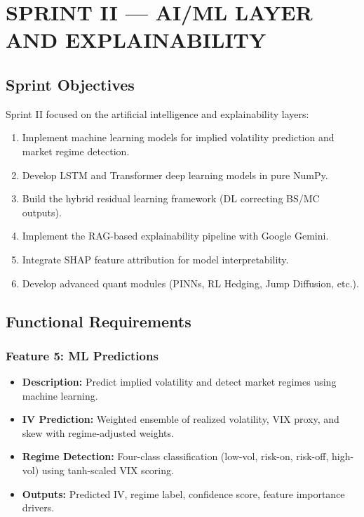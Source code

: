 \documentclass[12pt,a4paper]{report}
\begin{document}

\chapter{SPRINT II --- AI/ML LAYER AND EXPLAINABILITY}

\section{Sprint Objectives}

Sprint II focused on the artificial intelligence and explainability layers:

\begin{enumerate}
    \item Implement machine learning models for implied volatility prediction and market regime detection.
    \item Develop LSTM and Transformer deep learning models in pure NumPy.
    \item Build the hybrid residual learning framework (DL correcting BS/MC outputs).
    \item Implement the RAG-based explainability pipeline with Google Gemini.
    \item Integrate SHAP feature attribution for model interpretability.
    \item Develop advanced quant modules (PINNs, RL Hedging, Jump Diffusion, etc.).
\end{enumerate}

\section{Functional Requirements}

\subsection{Feature 5: ML Predictions}

\begin{itemize}
    \item \textbf{Description:} Predict implied volatility and detect market regimes using machine learning.
    \item \textbf{IV Prediction:} Weighted ensemble of realized volatility, VIX proxy, and skew with regime-adjusted weights.
    \item \textbf{Regime Detection:} Four-class classification (low-vol, risk-on, risk-off, high-vol) using tanh-scaled VIX scoring.
    \item \textbf{Outputs:} Predicted IV, regime label, confidence score, feature importance drivers.
\end{itemize}
\end{document}
